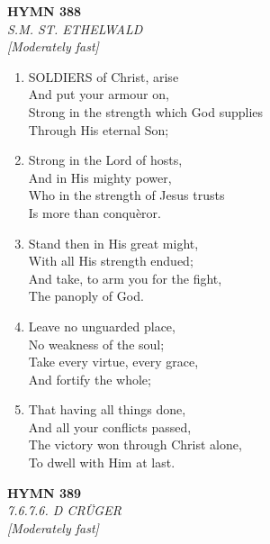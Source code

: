 \newpage
\begin{center}
    {\Large \textbf{HYMN 388}}
    \\
    \textit{S.M. ST. ETHELWALD}
    \\
    \textit{\small [Moderately fast]}
\end{center}
\vspace{1em}

\begin{enumerate}
    \item SOLDIERS of Christ, arise \\
        And put your armour on, \\
        Strong in the strength which God supplies \\
        Through His eternal Son;

    \item Strong in the Lord of hosts, \\
        And in His mighty power, \\
        Who in the strength of Jesus trusts \\
        Is more than conqu\`eror.

    \item Stand then in His great might, \\
        With all His strength endued; \\
        And take, to arm you for the fight, \\
        The panoply of God.

    \item Leave no unguarded place, \\
        No weakness of the soul; \\
        Take every virtue, every grace, \\
        And fortify the whole;

    \item That having all things done, \\
        And all your conflicts passed, \\
        The victory won through Christ alone, \\
        To dwell with Him at last.

\end{enumerate}

\newpage
\begin{center}
    {\Large \textbf{HYMN 389}}
    \\
    \textit{7.6.7.6. D CR\"{U}GER}
    \\
    \textit{\small [Moderately fast]}
\end{center}
\vspace{1em}


